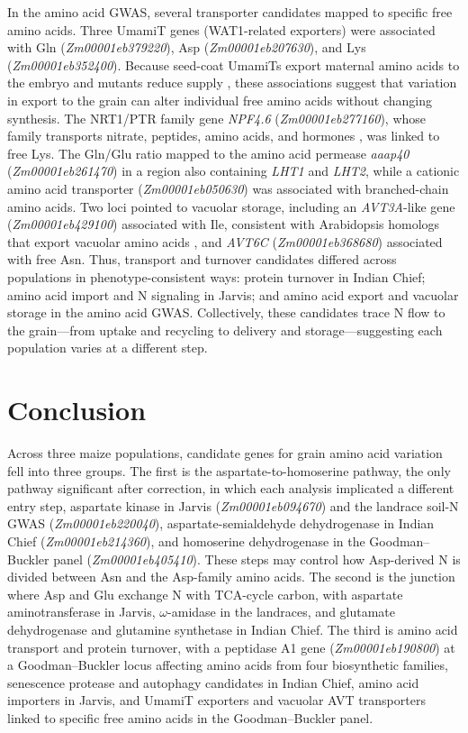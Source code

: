 In the amino acid GWAS, several transporter candidates mapped to specific free amino acids. Three UmamiT genes (WAT1-related exporters) were associated with Gln (\textit{Zm00001eb379220}), Asp (\textit{Zm00001eb207630}), and Lys (\textit{Zm00001eb352400}). Because seed-coat UmamiTs export maternal amino acids to the embryo and mutants reduce supply \citep{Muller2015UmamiT}, these associations suggest that variation in export to the grain can alter individual free amino acids without changing synthesis. The NRT1/PTR family gene \textit{NPF4.6} (\textit{Zm00001eb277160}), whose family transports nitrate, peptides, amino acids, and hormones \citep{Leran2014NPF}, was linked to free Lys. The Gln/Glu ratio mapped to the amino acid permease \textit{aaap40} (\textit{Zm00001eb261470}) in a region also containing \textit{LHT1} and \textit{LHT2}, while a cationic amino acid transporter (\textit{Zm00001eb050630}) was associated with branched-chain amino acids. Two loci pointed to vacuolar storage, including an \textit{AVT3A}-like gene (\textit{Zm00001eb429100}) associated with Ile, consistent with Arabidopsis homologs that export vacuolar amino acids \citep{Fujiki2017AtAVT3}, and \textit{AVT6C} (\textit{Zm00001eb368680}) associated with free Asn. Thus, transport and turnover candidates differed across populations in phenotype-consistent ways: protein turnover in Indian Chief; amino acid import and N signaling in Jarvis; and amino acid export and vacuolar storage in the amino acid GWAS. Collectively, these candidates trace N flow to the grain—from uptake and recycling to delivery and storage—suggesting each population varies at a different step.

\section{Conclusion}

Across three maize populations, candidate genes for grain amino acid variation fell into three groups. The first is the aspartate-to-homoserine pathway, the only pathway significant after correction, in which each analysis implicated a different entry step, aspartate kinase in Jarvis (\textit{Zm00001eb094670}) and the landrace soil-N GWAS (\textit{Zm00001eb220040}), aspartate-semialdehyde dehydrogenase in Indian Chief (\textit{Zm00001eb214360}), and homoserine dehydrogenase in the Goodman--Buckler panel (\textit{Zm00001eb405410}). These steps may control how Asp-derived N is divided between Asn and the Asp-family amino acids. The second is the junction where Asp and Glu exchange N with TCA-cycle carbon, with aspartate aminotransferase in Jarvis, $\omega$-amidase in the landraces, and glutamate dehydrogenase and glutamine synthetase in Indian Chief. The third is amino acid transport and protein turnover, with a peptidase A1 gene (\textit{Zm00001eb190800}) at a Goodman--Buckler locus affecting amino acids from four biosynthetic families, senescence protease and autophagy candidates in Indian Chief, amino acid importers in Jarvis, and UmamiT exporters and vacuolar AVT transporters linked to specific free amino acids in the Goodman--Buckler panel.

